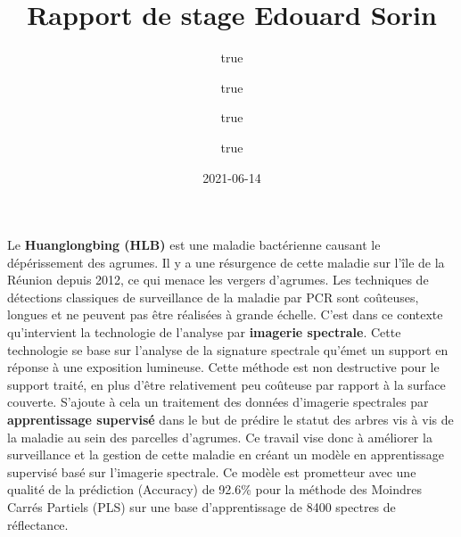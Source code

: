 \documentclass[
  11pt,
  french,
  a4paper,
  extrafontsizes,onecolumn,openright
  ]{memoir}
\title{Rapport de stage Edouard Sorin}
\author{true \and true \and true \and true}
\date{2021-06-14}
\begin{document}
\frontmatter



\cleardoublepage



\begin{description}

\item[Résumé:]
Le \textbf{Huanglongbing (HLB)} est une maladie bactérienne causant le dépérissement des agrumes. Il y a une résurgence de cette maladie sur l'île de la Réunion depuis 2012, ce qui menace les vergers d'agrumes. Les techniques de détections classiques de surveillance de la maladie par PCR sont coûteuses, longues et ne peuvent pas être réalisées à grande échelle. C'est dans ce contexte qu'intervient la technologie de l'analyse par \textbf{imagerie spectrale}. Cette technologie se base sur l'analyse de la signature spectrale qu'émet un support en réponse à une exposition lumineuse. Cette méthode est non destructive pour le support traité, en plus d'être relativement peu coûteuse par rapport à la surface couverte. S'ajoute à cela un traitement des données d'imagerie spectrales par \textbf{apprentissage supervisé} dans le but de prédire le statut des arbres vis à vis de la maladie au sein des parcelles d'agrumes. Ce travail vise donc à améliorer la surveillance et la gestion de cette maladie en créant un modèle en apprentissage supervisé basé sur l'imagerie spectrale. Ce modèle est prometteur avec une qualité de la prédiction (Accuracy) de 92.6\% pour la méthode des Moindres Carrés Partiels (PLS) sur une base d'apprentissage de 8400 spectres de réflectance.


\end{description}
\end{document}
